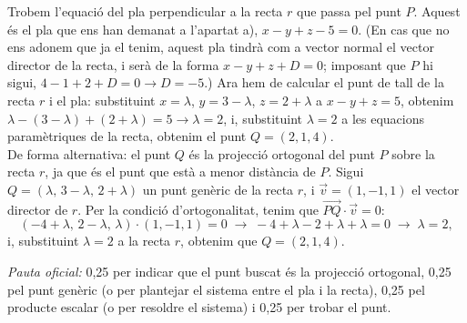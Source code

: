\begin{apartats}
\begin{solucio}
Trobem l'equació del pla perpendicular a la recta $r$ que passa pel punt $P$. Aquest és el pla que ens han demanat a
l'apartat a), $x-y+z-5=0$. (En cas que no ens adonem que ja el tenim, aquest pla tindrà com a vector normal el vector
director de la recta, i serà de la forma $x-y+z+D=0$; imposant que $P$ hi sigui, $4-1+2+D=0\rightarrow D=-5$.) Ara hem
de calcular el punt de tall de la recta $r$ i el pla: substituint $x=\lambda$, $y=3-\lambda$, $z=2+\lambda$ a
$x-y+z=5$, obtenim $\lambda-(3-\lambda)+(2+\lambda)=5\rightarrow\lambda=2$, i, substituint $\lambda=2$ a les equacions
paramètriques de la recta, obtenim el punt $\boxed{Q=(2,1,4)}$.\\
De forma alternativa: el punt $Q$ és la projecció ortogonal del punt $P$ sobre la recta $r$, ja que és el punt que està a
menor distància de $P$. Sigui $Q=(\lambda,\,3-\lambda,\,2+\lambda)$ un punt genèric de la recta $r$, i $\vec v=(1,-1,1)$
el vector director de $r$. Per la condició d'ortogonalitat, tenim que $\overrightarrow{PQ}\cdot\vec v=0$:
\[
(-4+\lambda,\,2-\lambda,\,\lambda)\cdot(1,-1,1)=0\;\rightarrow\;-4+\lambda-2+\lambda+\lambda=0\;\rightarrow\;\lambda=2,
\]
i, substituint $\lambda=2$ a la recta $r$, obtenim que $Q=(2,1,4)$.

\textit{Pauta oficial:} 0,25 per indicar que el punt buscat és la projecció ortogonal, 0,25 pel punt genèric (o per
plantejar el sistema entre el pla i la recta), 0,25 pel producte escalar (o per resoldre el sistema) i 0,25 per trobar
el punt.
\end{solucio}

\end{apartats}
